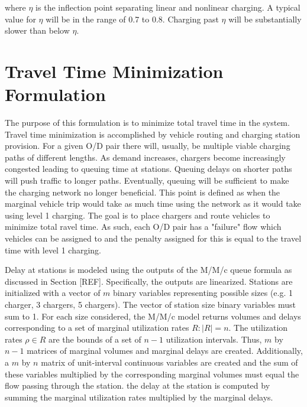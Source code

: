 \documentclass[12pt]{article}
\begin{document}
where $\eta$ is the inflection point separating linear and nonlinear charging. A typical value for $\eta$ will be in the range of 0.7 to 0.8. Charging past $\eta$ will be substantially slower than below $\eta$.

\section{Travel Time Minimization Formulation}

The purpose of this formulation is to minimize total travel time in the system. Travel time minimization is accomplished by vehicle routing and charging station provision. For a given O/D pair there will, usually, be multiple viable charging paths of different lengths. As demand increases, chargers become increasingly congested leading to queuing time at stations. Queuing delays on shorter paths will push traffic to longer paths. Eventually, queuing will be sufficient to make the charging network no longer beneficial. This point is defined as when the marginal vehicle trip would take as much time using the network as it would take using level 1 charging. The goal is to place chargers and route vehicles to minimize total ravel time. As such, each O/D pair has a "failure" flow which vehicles can be assigned to and the penalty assigned for this is equal to the travel time with level 1 charging.

Delay at stations is modeled using the outputs of the M/M/c queue formula as discussed in Section [REF]. Specifically, the outputs are linearized. Stations are initialized with a vector of $m$ binary variables representing possible sizes (e.g. 1 charger, 3 chargers, 5 chargers). The vector of station size binary variables must sum to 1. For each size considered, the M/M/c model returns volumes and delays corresponding to a set of marginal utilization rates $R: |R| = n$. The utilization rates $\rho \in R$ are the bounds of a set of $n - 1$ utilization intervals. Thus, $m$ by $n - 1$ matrices of marginal volumes and marginal delays are created. Additionally, a $m$ by $n$ matrix of unit-interval continuous variables are created and the sum of these variables multiplied by the corresponding marginal volumes must equal the flow passing through the station. the delay at the station is computed by summing the marginal utilization rates multiplied by the marginal delays.
\end{document}
